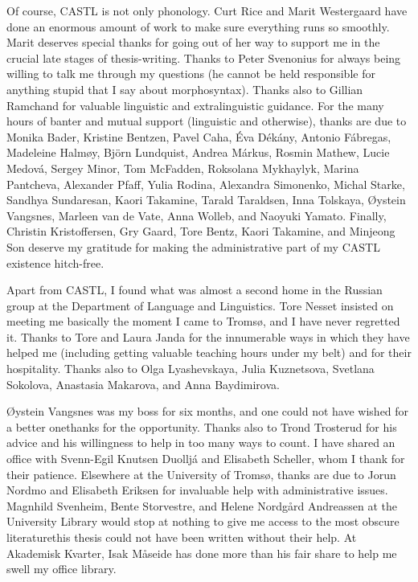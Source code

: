 Of course, CASTL is not only phonology. Curt Rice and Marit Westergaard have done an enormous amount of work to make sure everything runs so smoothly. Marit deserves special thanks for going out of her way to support me in the crucial late stages of thesis\hyp writing. Thanks to Peter Svenonius for always being willing to talk me through my questions (he cannot be held responsible for anything stupid that I say about morphosyntax). Thanks also to Gillian Ramchand for valuable linguistic and extralinguistic guidance. For the many hours of banter and mutual support (linguistic and otherwise), thanks are due to Monika Bader, Kristine Bentzen, Pavel Caha, Éva Dékány, Antonio Fábregas, Madeleine Halmøy, Björn Lundquist, Andrea Márkus, Rosmin Mathew, Lucie Medová, Sergey Minor, Tom McFadden, Roksolana Mykhaylyk, Marina Pantcheva, Alexander Pfaff, Yulia Rodina, Alexandra Simonenko, Michal Starke, Sandhya Sundaresan, Kaori Takamine, Tarald Taraldsen, Inna Tolskaya, Øystein Vangsnes, Marleen van de Vate, Anna Wolleb, and Naoyuki Yamato. Finally, Christin Kristoffersen, Gry Gaard, Tore Bentz, Kaori Takamine, and Minjeong Son deserve my gratitude for making the administrative part of my CASTL existence hitch\hyp free.

Apart from CASTL, I found what was almost a second home in the Russian group at the Department of Language and Linguistics. Tore Nesset insisted on meeting me basically the moment I came to Tromsø, and I have never regretted it. Thanks to Tore and Laura Janda for the innumerable ways in which they have helped me (including getting valuable teaching hours under my belt) and for their hospitality. Thanks also to Olga Lyashevskaya, Julia Kuznetsova, Svetlana Sokolova, Anastasia Makarova, and Anna Baydimirova.

Øystein Vangsnes was my boss for six months, and one could not have wished for a better one\dash thanks for the opportunity. Thanks also to Trond Trosterud for his advice and his willingness to help in too many ways to count. I have shared an office with Svenn-Egil Knutsen Duolljá and Elisabeth Scheller, whom I thank for their patience. Elsewhere at the University of Tromsø, thanks are due to Jorun Nordmo and Elisabeth Eriksen for invaluable help with administrative issues. Magnhild Svenheim, Bente Storvestre, and Helene Nordgård Andreassen at the University Library would stop at nothing to give me access to the most obscure literature\dash this thesis could not have been written without their help. At Akademisk Kvarter, Isak Måseide has done more than his fair share to help me swell my office library.

